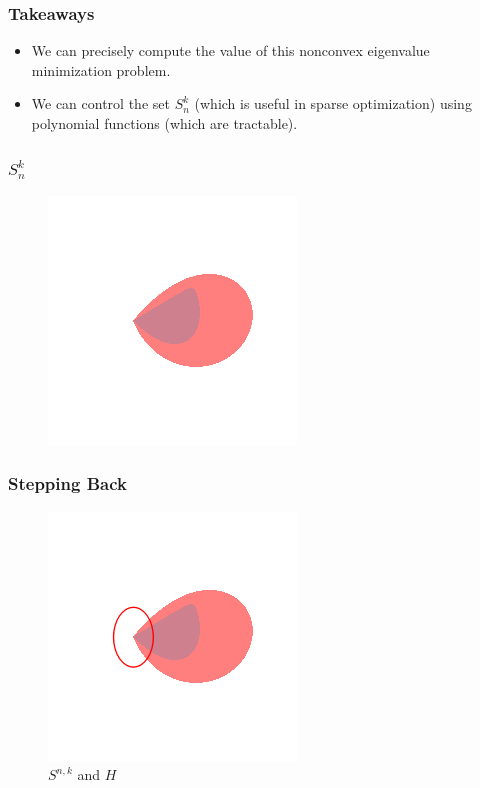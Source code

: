 \documentclass{beamer}
\begin{document}
\begin{frame}
    \frametitle{Takeaways}
    \begin{itemize}
        \item We can precisely compute the value of this nonconvex eigenvalue minimization problem.
        \item We can control the set $S^k_n$ (which is useful in sparse optimization) using polynomial functions (which are tractable).
    \end{itemize}
\end{frame}
\begin{frame}
    \frametitle{$S^k_n$}
    \begin{figure}[h]
        \centering
        \includegraphics[width=0.6\linewidth]{comparison.png}
    \end{figure}
\end{frame}
\begin{frame}
    \frametitle{Stepping Back}
    \begin{figure}[h]
        \centering
        \includegraphics[width=0.6\linewidth]{comparison_circle.png}
        \caption{$S^{n,k}$ and $H$}%
        \label{fig:just_snk}
    \end{figure}
\end{frame}
\end{document}
